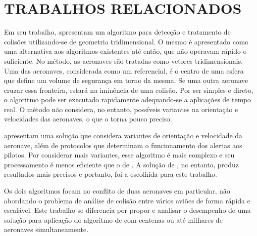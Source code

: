 \section{TRABALHOS RELACIONADOS}

Em seu trabalho,  apresentam um algoritmo para detecção e tratamento de colisões utilizando-se de geometria tridimensional. O mesmo é apresentado como uma alternativa aos algoritmos existentes até então, que não operavam rápido o suficiente. No método, as aeronaves são tratadas como vetores tridimensionais. Uma das aeronaves, considerada como um referencial, é o centro de uma esfera que define um volume de segurança em torno da mesma. Se uma outra aeronave cruzar essa fronteira, estará na iminência de uma colisão. Por ser simples e direto, o algoritmo pode ser executado rapidamente adequando-se a aplicações de tempo real. O método não considera, no entanto, possíveis variantes na orientação e velocidades das aeronaves, o que o torna pouco preciso.

 apresentam uma solução que considera variantes de orientação e velocidade da aeronave, além de protocolos que determinam o funcionamento dos alertas aos pilotos. Por considerar mais variantes, esse algoritmo é mais complexo e seu processamento é menos eficiente que o de . A solução de , no entanto, produz resultados mais precisos e portanto, foi a escolhida para este trabalho.

Os dois algoritmos focam no conflito de duas aeronaves em particular, não abordando o problema de análise de colisão entre vários aviões de forma rápida e escalável. Este trabalho se diferencia por propor e analisar o desempenho de uma solução para aplicação do algoritmo de  com centenas ou até milhares de aeronaves simultaneamente.

